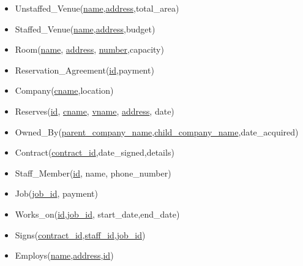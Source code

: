 \documentclass[11pt]{article}
\begin{document}
\begin{enumerate}
\begin{enumerate}
\begin{itemize}
\item Unstaffed\_Venue(\underline{name},\underline{address},total\_area)

\item Staffed\_Venue(\underline{name},\underline{address},budget)

\item Room(\underline{name}, \underline{address}, \underline{number},capacity)

\item Reservation\_Agreement(\underline{id},payment)

\item Company(\underline{cname},location)

\item Reserves(\underline{id}, \underline{cname}, \underline{vname},  \underline{address}, date)

\item Owned\_By(\underline{parent\_company\_name},\underline{child\_company\_name},date\_acquired)


\item Contract(\underline{contract\_id},date\_signed,details)

\item Staff\_Member(\underline{id}, name, phone\_number)

\item Job(\underline{job\_id}, payment)

\item Works\_on(\underline{id},\underline{job\_id}, start\_date,end\_date)

\item Signs(\underline{contract\_id},\underline{staff\_id},\underline{job\_id})

\item Employs(\underline{name},\underline{address},\underline{id})
\end{itemize}
\end{enumerate}



\end{enumerate}
\end{document}
